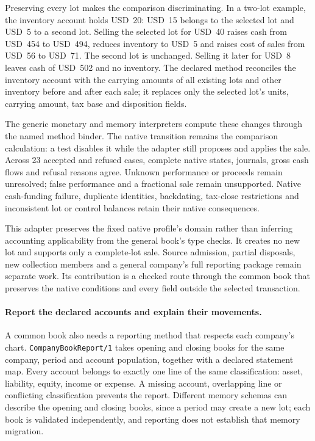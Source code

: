 Preserving every lot makes the comparison discriminating. In a two-lot example,
the inventory account holds USD~20: USD~15 belongs to the selected lot and USD~5
to a second lot. Selling the selected lot for USD~40 raises cash from USD~454
to USD~494, reduces inventory to USD~5 and raises cost of sales from USD~56 to
USD~71. The second lot is unchanged. Selling it later for USD~8 leaves cash of
USD~502 and no inventory. The declared method reconciles the inventory account
with the carrying amounts of all existing lots and other inventory before and
after each sale; it replaces only the selected lot's units, carrying amount,
tax base and disposition fields.

The generic monetary and memory interpreters compute these changes through the
named method binder. The native transition remains the comparison calculation:
a test disables it while the adapter still proposes and applies the sale. Across
23 accepted and refused cases, complete native states, journals, gross cash flows
and refusal reasons agree. Unknown performance or proceeds remain unresolved;
false performance and a fractional sale remain unsupported. Native cash-funding
failure, duplicate identities, backdating, tax-close restrictions and inconsistent
lot or control balances retain their native consequences.

This adapter preserves the fixed native profile's domain rather than inferring
accounting applicability from the general book's type checks. It creates no new
lot and supports only a complete-lot sale. Source admission, partial disposals,
new collection members and a general company's full reporting package remain
separate work. Its contribution is a checked route through the common book that
preserves the native conditions and every field outside the selected transaction.

\paragraph{Report the declared accounts and explain their movements.}
A common book also needs a reporting method that respects each company's chart.
\texttt{CompanyBookReport/1} takes opening and closing books for the same company,
period and account population, together with a declared statement map. Every
account belongs to exactly one line of the same classification: asset, liability,
equity, income or expense. A missing account, overlapping line or conflicting
classification prevents the report. Different memory schemas can describe the
opening and closing books, since a period may create a new lot; each book is
validated independently, and reporting does not establish that memory migration.

